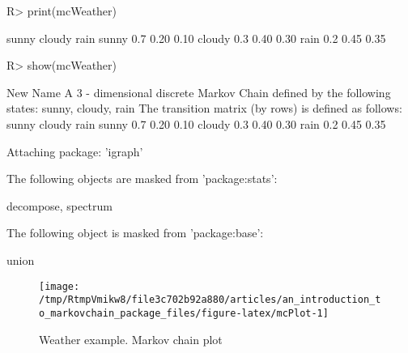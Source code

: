 \documentclass[
  nojss]{jss}
\begin{document}
\begin{CodeChunk}

\begin{CodeInput}
R> print(mcWeather)
\end{CodeInput}

\begin{CodeOutput}
       sunny cloudy rain
sunny    0.7   0.20 0.10
cloudy   0.3   0.40 0.30
rain     0.2   0.45 0.35
\end{CodeOutput}

\begin{CodeInput}
R> show(mcWeather)
\end{CodeInput}

\begin{CodeOutput}
New Name 
 A  3 - dimensional discrete Markov Chain defined by the following states: 
 sunny, cloudy, rain 
 The transition matrix  (by rows)  is defined as follows: 
       sunny cloudy rain
sunny    0.7   0.20 0.10
cloudy   0.3   0.40 0.30
rain     0.2   0.45 0.35
\end{CodeOutput}
\end{CodeChunk}

\begin{CodeChunk}

\begin{CodeOutput}

Attaching package: 'igraph'
\end{CodeOutput}

\begin{CodeOutput}
The following objects are masked from 'package:stats':

    decompose, spectrum
\end{CodeOutput}

\begin{CodeOutput}
The following object is masked from 'package:base':

    union
\end{CodeOutput}
\begin{figure}

{\centering \texttt{[image: /tmp/RtmpVmikw8/file3c702b92a880/articles/an\_introduction\_to\_markovchain\_package\_files/figure-latex/mcPlot-1]} 

}

\caption[Weather example]{Weather example. Markov chain plot}\label{fig:mcPlot}
\end{figure}
\end{CodeChunk}
\end{document}

